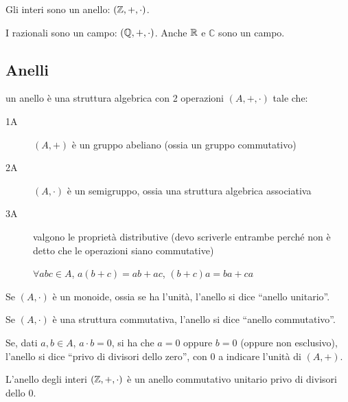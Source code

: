 Gli interi sono un anello: $\left( \mathbb{Z}, +, \cdot \right)$.

I razionali sono un campo: $\left( \mathbb{Q}, +, \cdot \right)$. Anche $\mathbb{R}$ e $\mathbb{C}$ sono un campo.

\subsection{Anelli}

un anello \`e una struttura algebrica con 2 operazioni $(A, +, \cdot)$ tale che:

\begin{description}
    \item[1A] $(A, +)$ \`e un gruppo abeliano (ossia un gruppo commutativo)
    \item[2A] $(A, \cdot)$ \`e un semigruppo, ossia una struttura algebrica associativa
    \item[3A] valgono le propriet\`a distributive (devo scriverle entrambe perch\'e non \`e detto che le operazioni siano commutative)

    $\forall a b c \in A$, $ a (b + c) = ab + ac$, $(b + c) a = b a + c a$
\end{description}

\begin{defn}
Se $ (A, \cdot)$ \`e un monoide, ossia se ha l'unit\`a, l'anello si dice ``anello unitario''.
\end{defn}
\begin{defn}
Se $(A, \cdot)$ \`e una struttura commutativa, l'anello si dice ``anello commutativo''.
\end{defn}
\begin{defn}
Se, dati $a, b \in A$, $a \cdot b = 0$, si ha che $a = 0$ oppure $b = 0$ (oppure non esclusivo), l'anello si dice ``privo di divisori dello zero'', con 0 a indicare l'unit\`a di $(A, +)$.
\end{defn}

L'anello degli interi $(\mathbb{Z}, +, \cdot)$ \`e un anello commutativo unitario privo di divisori dello 0.

